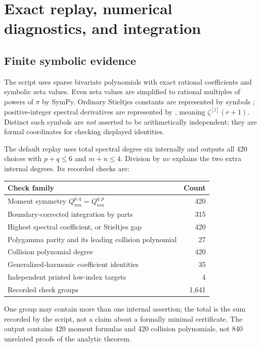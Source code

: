 \documentclass[11pt,a4paper]{article}
\numberwithin{equation}{section}
\theoremstyle{definition}
\newcommand{\src}[1]{\texttt{\detokenize{#1}}}
\begin{document}
\section{Exact replay, numerical diagnostics, and integration}\label{csc:verification}
\subsection{Finite symbolic evidence}
The script \src{code/exact_engine.py} uses sparse bivariate polynomials with exact rational coefficients and symbolic zeta values. Even zeta values are simplified to rational multiples of powers of $\pi$ by SymPy. Ordinary Stieltjes constants are represented by symbols \src{g_j}; positive-integer spectral derivatives are represented by \src{zd_r_j}, meaning $\zeta^{[j]}(r+1)$. Distinct such symbols are \emph{not} asserted to be arithmetically independent; they are formal coordinates for checking displayed identities.

The default replay uses total spectral degree six internally and outputs all 420 choices with $p+q\le6$ and $m+n\le4$. Division by $uv$ explains the two extra internal degrees. Its recorded checks are:
\begin{center}
\begin{tabular}{@{}lr@{}}
\toprule
Check family & Count\\
\midrule
Moment symmetry $Q_{mn}^{p,q}=Q_{nm}^{q,p}$ & 420\\
Boundary-corrected integration by parts & 315\\
Highest spectral coefficient, or Stieltjes gap & 420\\
Polygamma parity and its leading collision polynomial & 27\\
Collision polynomial degree & 420\\
Generalized-harmonic coefficient identities & 35\\
Independent printed low-index targets & 4\\
\midrule
Recorded check groups & 1,641\\
\bottomrule
\end{tabular}
\end{center}
One group may contain more than one internal assertion; the total is the sum recorded by the script, not a claim about a formally minimal certificate. The output contains 420 moment formulas and 420 collision polynomials, not 840 unrelated proofs of the analytic theorem.
\end{document}
